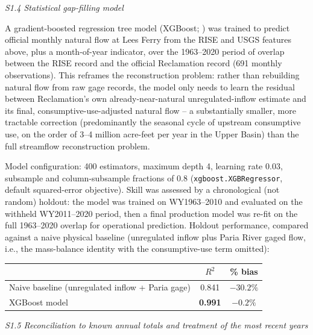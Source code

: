 \documentclass[draft,grl]{agutexSI2019}
\begin{document}
\begin{article}
\noindent\textit{S1.4 Statistical gap-filling model}

A gradient-boosted regression tree model (XGBoost; ) was trained to predict official monthly natural flow at Lees Ferry from the RISE and USGS features above, plus a month-of-year indicator, over the 1963--2020 period of overlap between the RISE record and the official Reclamation record (691 monthly observations). This reframes the reconstruction problem: rather than rebuilding natural flow from raw gage records, the model only needs to learn the residual between Reclamation's own already-near-natural unregulated-inflow estimate and its final, consumptive-use-adjusted natural flow -- a substantially smaller, more tractable correction (predominantly the seasonal cycle of upstream consumptive use, on the order of 3--4 million acre-feet per year in the Upper Basin) than the full streamflow reconstruction problem.

Model configuration: 400 estimators, maximum depth 4, learning rate 0.03, subsample and column-subsample fractions of 0.8 (\texttt{xgboost.XGBRegressor}, default squared-error objective). Skill was assessed by a chronological (not random) holdout: the model was trained on WY1963--2010 and evaluated on the withheld WY2011--2020 period, then a final production model was re-fit on the full 1963--2020 overlap for operational prediction. Holdout performance, compared against a naive physical baseline (unregulated inflow plus Paria River gaged flow, i.e., the mass-balance identity with the consumptive-use term omitted):

\begin{center}
\begin{tabular}{lcc}
\hline
 & $R^2$ & \% bias \\
\hline
Naive baseline (unregulated inflow + Paria gage) & 0.841 & $-30.2\%$ \\
XGBoost model & \textbf{0.991} & \textbf{$-0.2\%$} \\
\hline
\end{tabular}
\end{center}

\noindent\textit{S1.5 Reconciliation to known annual totals and treatment of the most recent years}


\end{article}
\end{document}
